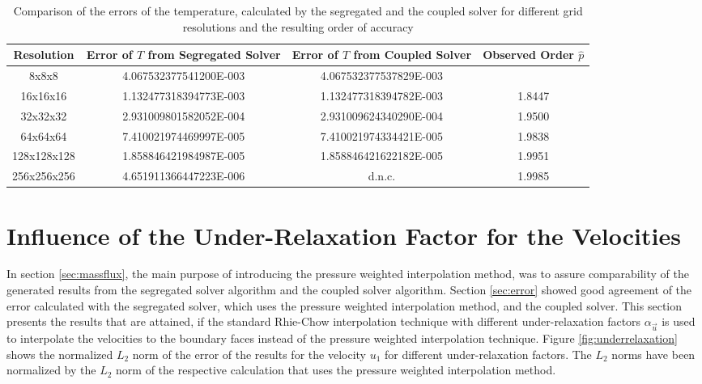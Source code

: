 \begin{table}[h!]\centering
{}
  \caption{Comparison of the errors of the temperature, calculated by the segregated and the coupled solver for different grid resolutions and the resulting order of accuracy}
  \begin{tabular}{cccc}\toprule
    Resolution & Error of \(T\) from Segregated Solver & Error of \(T\) from Coupled Solver & Observed Order \(\hat{p}\) \\
    \midrule
    \rowcolor{tud0a} 8x8x8       & 4.067532377541200E-003  & 4.067532377537829E-003  &        \\%
    \rowcolor{black!00} 16x16x16    & 1.132477318394773E-003  & 1.132477318394782E-003  & 1.8447 \\%
    \rowcolor{tud0a} 32x32x32    & 2.931009801582052E-004  & 2.931009624340290E-004  & 1.9500 \\%
    \rowcolor{black!00} 64x64x64    & 7.410021974469997E-005  & 7.410021974334421E-005  & 1.9838 \\%
    \rowcolor{tud0a} 128x128x128 & 1.858846421984987E-005  & 1.858846421622182E-005  & 1.9951 \\%
    \rowcolor{black!00} 256x256x256 & 4.651911366447223E-006  & d.n.c.                  & 1.9985 \\%
  \end{tabular}
  \label{tab:temporder}
\end{table}

\section{Influence of the Under-Relaxation Factor for the Velocities}
\label{sec:independence}

In section \ref{sec:massflux}, the main purpose of introducing the pressure weighted interpolation method, was to assure comparability of the generated results from the segregated solver algorithm and the coupled solver algorithm. Section \ref{sec:error} showed good agreement of the error calculated with the segregated solver, which uses the pressure weighted interpolation method, and the coupled solver. This section presents the results that are attained, if the standard Rhie-Chow interpolation technique with different under-relaxation factors \(\alpha_\vec{u}\) is used to interpolate the velocities to the boundary faces instead of the pressure weighted interpolation technique. Figure \ref{fig:underrelaxation} shows the normalized \(L_2\) norm of the error of the results for the velocity \(u_1\) for different under-relaxation factors. The \(L_2\) norms have been normalized by the \(L_2\) norm of the respective calculation that uses the pressure weighted interpolation method. 

